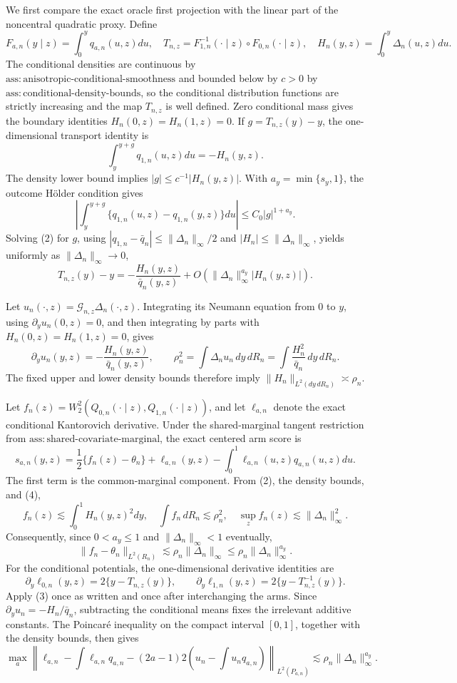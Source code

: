 We first compare the exact oracle first projection with the linear part of the noncentral quadratic proxy. Define
\[
F_{a,n}(y\mid z)=\int_0^yq_{a,n}(u,z)du,
\quad
T_{n,z}=F_{1,n}^{-1}(\cdot\mid z)\circ F_{0,n}(\cdot\mid z),
\quad
H_n(y,z)=\int_0^y\Delta_n(u,z)du.
\]
The conditional densities are continuous by \(\mathrm{ass{:}anisotropic\text{-}conditional\text{-}smoothness}\) and bounded below by \(c>0\) by \(\mathrm{ass{:}conditional\text{-}density\text{-}bounds}\), so the conditional distribution functions are strictly increasing and the map \(T_{n,z}\) is well defined. Zero conditional mass gives the boundary identities \(H_n(0,z)=H_n(1,z)=0\). If \(g=T_{n,z}(y)-y\), the one-dimensional transport identity is
\[
\int_y^{y+g}q_{1,n}(u,z)du=-H_n(y,z). \tag{2}
\]
The density lower bound implies \(|g|\le c^{-1}|H_n(y,z)|\). With \(a_y=\min\{s_y,1\}\), the outcome H\"older condition gives
\[
\left|\int_y^{y+g}\{q_{1,n}(u,z)-q_{1,n}(y,z)\}du\right|
\le C_0|g|^{1+a_y}.
\]
Solving (2) for \(g\), using \(|q_{1,n}-\bar q_n|\le\|\Delta_n\|_\infty/2\) and \(|H_n|\le\|\Delta_n\|_\infty\), yields uniformly as \(\|\Delta_n\|_\infty\to0\),
\[
T_{n,z}(y)-y
=-\frac{H_n(y,z)}{\bar q_n(y,z)}
+O\!\left(\|\Delta_n\|_\infty^{a_y}|H_n(y,z)|\right). \tag{3}
\]

Let \(u_n(\cdot,z)=\mathcal G_{n,z}\Delta_n(\cdot,z)\). Integrating its Neumann equation from \(0\) to \(y\), using \(\partial_yu_n(0,z)=0\), and then integrating by parts with \(H_n(0,z)=H_n(1,z)=0\), gives
\[
\partial_yu_n(y,z)=-\frac{H_n(y,z)}{\bar q_n(y,z)},
\qquad
\rho_n^2=\int\Delta_nu_n\,dy\,dR_n
=\int\frac{H_n^2}{\bar q_n}\,dy\,dR_n. \tag{4}
\]
The fixed upper and lower density bounds therefore imply \(\|H_n\|_{L^2(dy\,dR_n)}\asymp\rho_n\).

Let \(f_n(z)=W_2^2(Q_{0,n}(\cdot\mid z),Q_{1,n}(\cdot\mid z))\), and let \(\ell_{a,n}\) denote the exact conditional Kantorovich derivative. Under the shared-marginal tangent restriction from \(\mathrm{ass{:}shared\text{-}covariate\text{-}marginal}\), the exact centered arm score is
\[
s_{a,n}(y,z)
=\frac12\{f_n(z)-\theta_n\}
+\ell_{a,n}(y,z)-\int_0^1\ell_{a,n}(u,z)q_{a,n}(u,z)du. \tag{5}
\]
The first term is the common-marginal component. From (2), the density bounds, and (4),
\[
f_n(z)\lesssim\int_0^1H_n(y,z)^2dy,
\quad
\int f_n\,dR_n\lesssim\rho_n^2,
\quad
\sup_z f_n(z)\lesssim\|\Delta_n\|_\infty^2.
\]
Consequently, since \(0<a_y\le1\) and \(\|\Delta_n\|_\infty<1\) eventually,
\[
\|f_n-\theta_n\|_{L^2(R_n)}
\lesssim\rho_n\|\Delta_n\|_\infty
\le\rho_n\|\Delta_n\|_\infty^{a_y}. \tag{6}
\]
For the conditional potentials, the one-dimensional derivative identities are
\[
\partial_y\ell_{0,n}(y,z)=2\{y-T_{n,z}(y)\},
\qquad
\partial_y\ell_{1,n}(y,z)=2\{y-T_{n,z}^{-1}(y)\}.
\]
Apply (3) once as written and once after interchanging the arms. Since \(\partial_yu_n=-H_n/\bar q_n\), subtracting the conditional means fixes the irrelevant additive constants. The Poincar\'e inequality on the compact interval \([0,1]\), together with the density bounds, then gives
\[
\max_a\left\|
\ell_{a,n}-\int\ell_{a,n}q_{a,n}
-(2a-1)2\left(u_n-\int u_nq_{a,n}\right)
\right\|_{L^2(P_{a,n})}
\lesssim\rho_n\|\Delta_n\|_\infty^{a_y}. \tag{7}
\]

